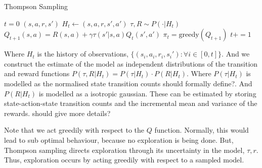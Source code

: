 \begin{algorithm}
	\caption{Thompson Sampling}
	\begin{algorithmic}[1]

		\State $t=0$
		\State $(s, a, r, s')$ 
		\State $H_t \leftarrow (s, a, r, s', a')$ 
		\State $\tau, R \sim P(\cdot | H_t)$ 
		\State $Q_{t+1}(s, a) = R(s, a) + \gamma \tau(s'| s, a) Q_t(s', a')$ 
		\State $\pi_t = \text{greedy}(Q_{t+1})$ 
		\State $t += 1$

		\EndWhile
		\State {}
		\EndProcedure

	\end{algorithmic}
\end{algorithm}

Where $H_t$ is the history of observations, $\{(s_i, a_i, r_i, s_i') : \forall i \in [0, t]\}$.
And we construct the estimate of the model as independent distributions of the transition and reward functions $P(\tau, R | H_t) = P(\tau | H_t) \cdot P(R | H_t)$. Where $P(\tau | H_t)$
is modelled as the normalised state transition counts {\color{red}should formally define?}.
And $P(R | H_t)$ is modelled as a isotropic gaussian.
These can be estimated by storing state-action-state transition counts
and the incremental mean and variance of the rewards. {\color{red}should give more details?}

Note that we act greedily with respect to the $Q$ function. Normally, this would
lead to sub optimal behaviour, because no exploration is being done. But, Thompson sampling
directs exploration through its uncertainty in the model, $\tau, r$. Thus,
exploration occurs by acting greedily with respect to a sampled model.

